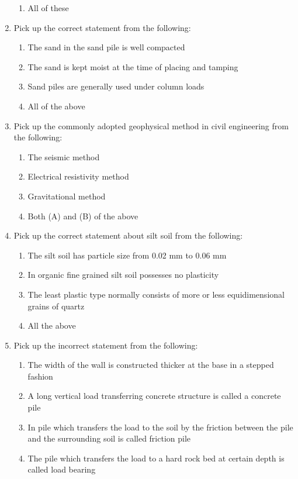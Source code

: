 \documentclass[11pt,a4paper]{article}
\begin{document}
\begin{enumerate}
\begin{enumerate}[label=\Alph*.]
\item{All of these}
\end{enumerate}
\item{Pick up the correct statement from the following:}
\begin{enumerate}[label=\Alph*.]
\item{The sand in the sand pile is well compacted}
\item{The sand is kept moist at the time of placing and tamping}
\item{Sand piles are generally used under column loads}
\item{All of the above}
\end{enumerate}
\item{Pick up the commonly adopted geophysical method in civil engineering from the following:}
\begin{enumerate}[label=\Alph*.]
\item{The seismic method}
\item{Electrical resistivity method}
\item{Gravitational method}
\item{Both (A) and (B) of the above}
\end{enumerate}
\item{Pick up the correct statement about silt soil from the following:}
\begin{enumerate}[label=\Alph*.]
\item{The silt soil has particle size from 0.02 mm to 0.06 mm}
\item{In organic fine grained silt soil possesses no plasticity}
\item{The least plastic type normally consists of more or less equidimensional grains of quartz}
\item{All the above}
\end{enumerate}
\item{Pick up the incorrect statement from the following:}
\begin{enumerate}[label=\Alph*.]
\item{The width of the wall is constructed thicker at the base in a stepped fashion}
\item{A long vertical load transferring concrete structure is called a concrete pile}
\item{In pile which transfers the load to the soil by the friction between the pile and the surrounding soil is called friction pile}
\item{The pile which transfers the load to a hard rock bed at certain depth is called load bearing}
\end{enumerate}
\end{enumerate}
\end{document}
